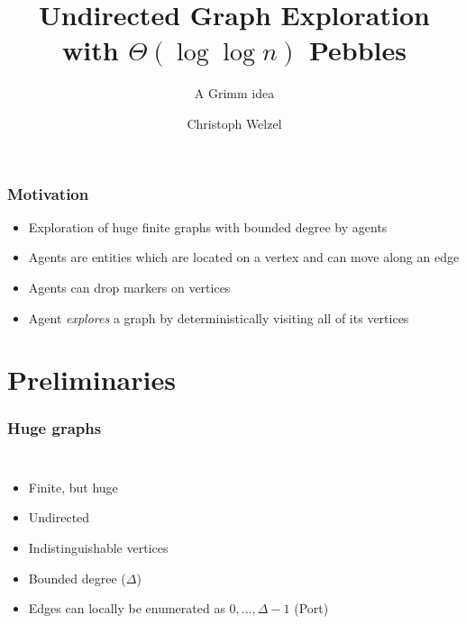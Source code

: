 \documentclass{beamer}
\title{Undirected Graph Exploration with $\Theta(\log\log n)$ Pebbles}
\subtitle{A Grimm idea}
\author{Christoph Welzel}
\institute{Logik und Theorie diskreter Systeme, RWTH Aachen}
\begin{document}
\maketitle
\begin{frame}
  \frametitle{Motivation}
  \begin{itemize}
    \item Exploration of huge finite graphs with bounded degree by agents
    \item Agents are entities which are located on a vertex and can move along
      an edge
    \item Agents can drop markers on vertices
    \item Agent \emph{explores} a graph by deterministically visiting all of
      its vertices
  \end{itemize}
\end{frame}

\section{Preliminaries}
\begin{frame}
  \frametitle{Huge graphs}
  \begin{columns}
    \begin{itemize}
      \item Finite, but huge
      \item Undirected
      \item Indistinguishable vertices
      \item Bounded degree ($\Delta$)
      \item Edges can locally be enumerated as $0,\dots,\Delta-1$
        (Port)
    \end{itemize}
    \begin{center}
      \resizebox{\textwidth}{!}{}
    \end{center}
  \end{columns}
\end{frame}
\end{document}
